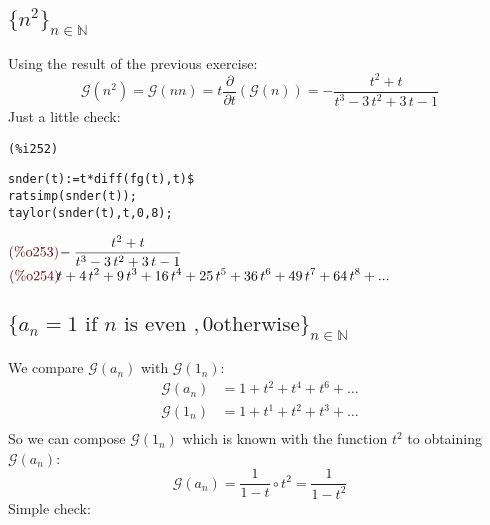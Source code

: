 \subsection{$\{n^2\}_{n\in \mathbb{N} }$}
Using the result of the previous exercise:
\begin{displaymath}
  \mathcal{G} (n^2) = \mathcal{G} (n n) = t
  \frac{\partial}{\partial t}\left( \mathcal{G} (n) \right) = 
  -\frac{{t}^{2}+t}{{t}^{3}-3\,{t}^{2}+3\,t-1}
\end{displaymath}
Just a little check:\\
\noindent
\begin{minipage}[t]{8ex}{\color{red}\bf
\begin{verbatim}
(%i252) 
\end{verbatim}}
\end{minipage}
\begin{minipage}[t]{\textwidth}{\color{blue}
\begin{verbatim}
snder(t):=t*diff(fg(t),t)$
ratsimp(snder(t));
taylor(snder(t),t,0,8);
\end{verbatim}}
\end{minipage}
\begin{math}\displaystyle
\parbox{8ex}{\color{labelcolor}(\%o253) }
-\frac{{t}^{2}+t}{{t}^{3}-3\,{t}^{2}+3\,t-1}
\end{math}\\
\begin{math}\displaystyle
\parbox{8ex}{\color{labelcolor}(\%o254) }
t+4\,{t}^{2}+9\,{t}^{3}+16\,{t}^{4}+25\,{t}^{5}+36\,{t}^{6}+49\,{t}^{7}+64\,{t}^{8}+...
\end{math}

\subsection{$\{a_n = 1 \text{ if } n \text{ is even }, 0 \text{
    otherwise}\}_{n\in \mathbb{N} }$}

We compare $\mathcal{G}(a_n) $ with $\mathcal{G} (1_n)$:
\begin{displaymath}
  \begin{split}
    \mathcal{G} (a_n) &= 1 + t^2 + t^4 + t^6 + \ldots \\
    \mathcal{G} (1_n) &= 1 + t^1 + t^2 + t^3 + \ldots \\
  \end{split}
\end{displaymath}
So we can compose $\mathcal{G} (1_n)$ which is known with the function
$t^2$ to obtaining $\mathcal{G} (a_n)$:
\begin{displaymath}
  \mathcal{G} (a_n) =  \frac{1}{1-t} \circ t^2 =  \frac{1}{1-t^2} 
\end{displaymath}
Simple check:

